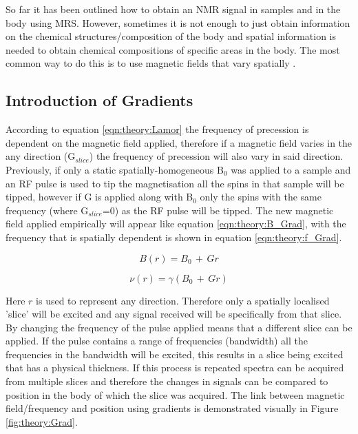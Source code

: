 So far it has been outlined how to obtain an \ac{NMR} signal in samples and in the body using MRS. However, sometimes it is not enough to just obtain information on the chemical structures/composition of the body and spatial information is needed to obtain chemical compositions of specific areas in the body. The most common way to do this is to use magnetic fields that vary spatially \cite{Haacke2014MagneticDesign}. 

\subsection{Introduction of Gradients}

According to equation \ref{eqn:theory:Lamor} the frequency of precession is dependent on the magnetic field applied, therefore if a magnetic field varies in the any direction (G$_{slice}$) the frequency of precession will also vary in said direction. Previously, if only a static spatially-homogeneous B$_0$ was applied to a sample and an \ac{RF} pulse is used to tip the magnetisation all the spins in that sample will be tipped, however if G is applied along with B$_0$ only the spins with the same frequency (where G$_{slice}$=0) as the \ac{RF} pulse will be tipped. The new magnetic field applied empirically will appear like equation \ref{eqn:theory:B_Grad}, with the frequency that is spatially dependent is shown in equation \ref{eqn:theory:f_Grad}.

\begin{equation}
    B(r) = B_0 \, + \, Gr
    \label{eqn:theory:B_Grad}
\end{equation}

\begin{equation}
    \nu(r) = \gamma(B_0 \, + \, Gr)
    \label{eqn:theory:f_Grad}
\end{equation}

Here $r$ is used to represent any direction. Therefore only a spatially localised 'slice' will be excited and any signal received will be specifically from that slice. By changing the frequency of the pulse applied means that a different slice can be applied. If the pulse contains a range of frequencies (bandwidth) all the frequencies in the bandwidth will be excited, this results in a slice being excited that has a physical thickness. If this process is repeated spectra can be acquired from multiple slices and therefore the changes in signals can be compared to position in the body of which the slice was acquired. The link between magnetic field/frequency and position using gradients is demonstrated visually in Figure \ref{fig:theory:Grad}.

